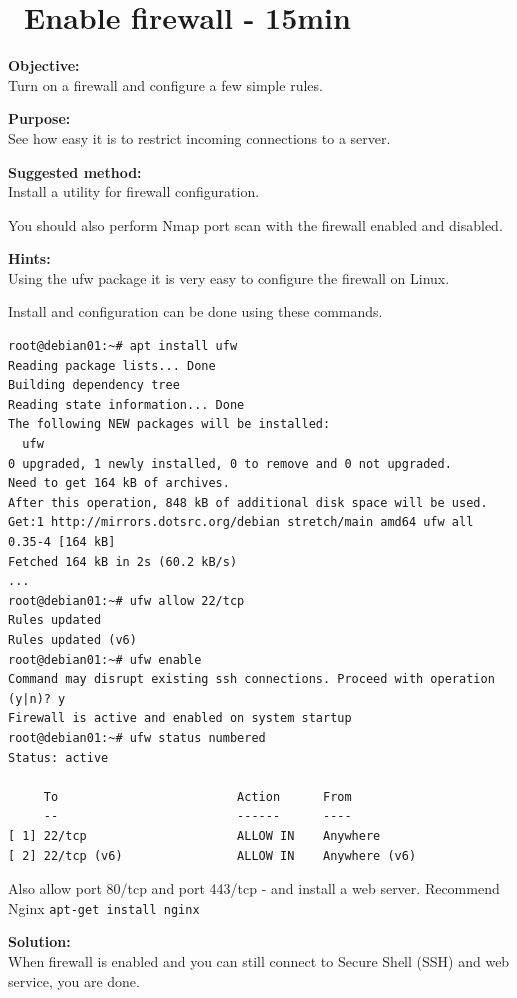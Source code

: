 \documentclass[a4paper,11pt,notitlepage]{report}
\begin{document}
\chapter{\faExclamationTriangle\ Enable firewall - 15min}
\label{ex:debian-firewall}

{\bf Objective:}\\
Turn on a firewall and configure a few simple rules.

{\bf Purpose:}\\
See how easy it is to restrict incoming connections to a server.


{\bf Suggested method:}\\
Install a utility for firewall configuration.

You should also perform Nmap port scan with the firewall enabled and disabled.

{\bf Hints:}\\
Using the ufw package it is very easy to configure the firewall on Linux.

Install and configuration can be done using these commands.
\begin{verbatim}
root@debian01:~# apt install ufw
Reading package lists... Done
Building dependency tree
Reading state information... Done
The following NEW packages will be installed:
  ufw
0 upgraded, 1 newly installed, 0 to remove and 0 not upgraded.
Need to get 164 kB of archives.
After this operation, 848 kB of additional disk space will be used.
Get:1 http://mirrors.dotsrc.org/debian stretch/main amd64 ufw all 0.35-4 [164 kB]
Fetched 164 kB in 2s (60.2 kB/s)
...
root@debian01:~# ufw allow 22/tcp
Rules updated
Rules updated (v6)
root@debian01:~# ufw enable
Command may disrupt existing ssh connections. Proceed with operation (y|n)? y
Firewall is active and enabled on system startup
root@debian01:~# ufw status numbered
Status: active

     To                         Action      From
     --                         ------      ----
[ 1] 22/tcp                     ALLOW IN    Anywhere
[ 2] 22/tcp (v6)                ALLOW IN    Anywhere (v6)
\end{verbatim}

Also allow port 80/tcp and port 443/tcp - and install a web server. Recommend Nginx \verb+apt-get install nginx+

{\bf Solution:}\\
When firewall is enabled and you can still connect to Secure Shell (SSH) and web service, you are done.
\end{document}
